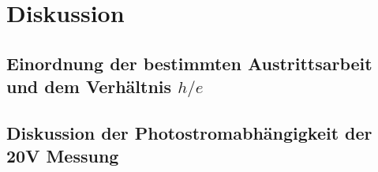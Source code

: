 \section{Diskussion}
\label{sec:Diskussion}
\subsection{Einordnung der bestimmten Austrittsarbeit und dem Verhältnis $h/e$}
\subsection{Diskussion der Photostromabhängigkeit der 20V Messung}
